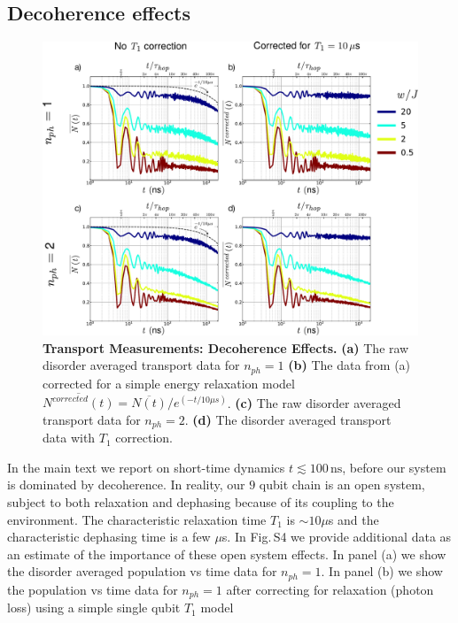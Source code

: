 \subsection{Decoherence effects}
\begin{figure}[h]
\label{decoherence_effects}
\centering
\includegraphics[width=170mm, keepaspectratio]{./PDF/fs5_190919_1208p.pdf}%
\caption{\textbf{Transport Measurements:  Decoherence Effects.}
\textbf{(a)} The raw disorder averaged transport data for $n_{ph}=1$
\textbf{(b)} The data from (a) corrected for a simple energy relaxation model $\overline{N^{corrected} \left( t \right)} = \overline{N \left( t \right)} / e^{\left( -t/10 \mu s \right) }$.
\textbf{(c)} The raw disorder averaged transport data for $n_{ph}=2$.
\textbf{(d)} The disorder averaged transport data with $T_{1}$ correction.
}\end{figure}
In the main text we report on short-time dynamics $t\lesssim 100 \, \text{ns}$, before our system is dominated by decoherence.
In reality, our $9$ qubit chain is an open system, subject to both relaxation and dephasing because of its coupling to the environment.
The characteristic relaxation time $T_1$ is $\sim 10 \mu$s and the characteristic dephasing time is a few $\mu$s.
In Fig.\,S4 we provide additional data as an estimate of the importance of these open system effects.
In panel (a) we show the disorder averaged population vs time data for $n_{ph}=1$.
In panel (b) we show the population vs time data for $n_{ph}=1$ after correcting for relaxation (photon loss) using a simple single qubit $T_1$ model

